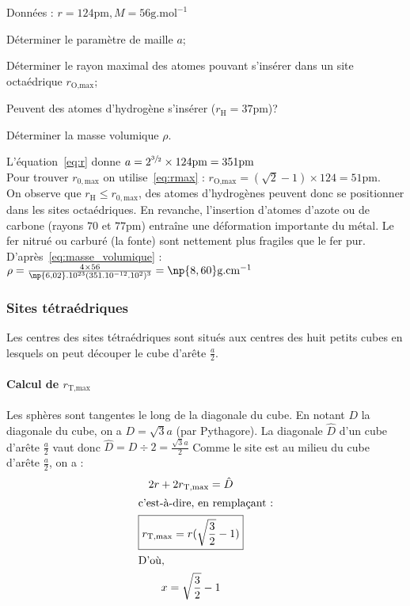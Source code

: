 \begin{ex}
    Données : $r = 124\text{pm}, M = 56\text{g.mol}^{-1}$
    \begin{compactitem}
        \item Déterminer le paramètre de maille $a$;
        \item Déterminer le rayon maximal des atomes pouvant s'insérer dans un
            site octaédrique $r_{\text{O,max}}$;
        \item Peuvent des atomes d'hydrogène s'insérer ($r_{\text{H}} = 37$pm)?
        \item Déterminer la masse volumique $\rho$.
    \end{compactitem}
    L'équation~\ref{eq:r} donne
    $a=2^{\sfrac{3}{2}} \times 124\text{pm} = 351\text{pm}$\\
    Pour trouver $r_{0,\text{max}}$ on utilise~\ref{eq:rmax} :
    $r_{\text{O,max}} = (\sqrt{2} - 1)\times 124 = 51\text{pm}$.\\
    On observe que $r_{\text{H}} \leq r_{0,\text{max}}$, des atomes
    d'hydrogènes peuvent donc se positionner dans les sites
    octaédriques. En revanche, l'insertion d'atomes d'azote ou de
    carbone (rayons $70$ et $77$pm) entraîne une déformation importante
    du métal. Le fer nitrué ou carburé (la fonte) sont nettement
    plus fragiles que le fer pur.\\
    D'après~\ref{eq:masse_volumique} :
    $\rho = \frac{4 \times 56}{\np{6,02}.10^{23}(351.10^{-12}.10^2)^3} = \np{8,60}\text{g.cm}^{-1}$
\end{ex}

\subsubsection{Sites tétraédriques}
Les centres des sites tétraédriques sont situés aux centres des
huit petits cubes en lesquels on peut découper le cube d’arête
$\frac{a}{2}$.
\paragraph{Calcul de $r_{\text{T,max}}$}
Les sphères sont tangentes le long de la diagonale du cube.
En notant $D$ la diagonale du cube, on a $D = \sqrt{3}a$
(par Pythagore). La diagonale $\hat{D}$ d'un cube d'arête $\frac{a}{2}$
vaut donc $\hat{D} = D\div 2 = \frac{\sqrt{3}a}{2}$
Comme le site est au milieu du cube d'arête $\frac{a}{2}$, on a :
\begin{gather}
    2r + 2r_{\text{T,max}} = \hat{D}\\
    \intertext{c'est-à-dire, en remplaçant :}
    \boxed{r_{\text{T,max}} = r(\sqrt{\frac{3}{2}} - 1)}\label{eq:rmax_tetra}\\
    \intertext{D'où,}
    x = \sqrt{\frac{3}{2}} - 1
\end{gather}


